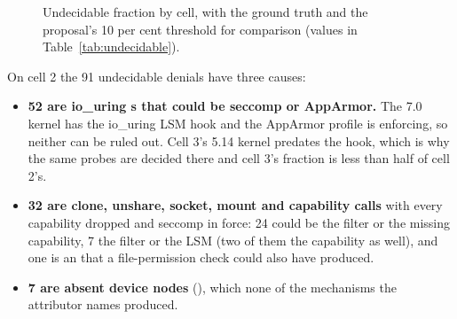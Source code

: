 \begin{figure}[htbp]
\centering
{}
\caption{Undecidable fraction by cell, with the ground truth and the proposal's 10 per cent threshold for comparison (values in Table~\ref{tab:undecidable}).}
\label{fig:undecidable}
\end{figure}

On cell 2 the 91 undecidable denials have three causes:
\begin{itemize}[leftmargin=*]
\item \textbf{52 are io\_uring s that could be seccomp or AppArmor.} The 7.0 kernel has the io\_uring LSM hook and the AppArmor profile is enforcing, so neither can be ruled out. Cell 3's 5.14 kernel predates the hook, which is why the same probes are decided there and cell 3's fraction is less than half of cell 2's.
\item \textbf{32 are clone, unshare, socket, mount and capability calls} with every capability dropped and seccomp in force: 24 could be the filter or the missing capability, 7 the filter or the LSM (two of them the capability as well), and one is an  that a file-permission check could also have produced.
\item \textbf{7 are absent device nodes} (), which none of the mechanisms the attributor names produced.
\end{itemize}

